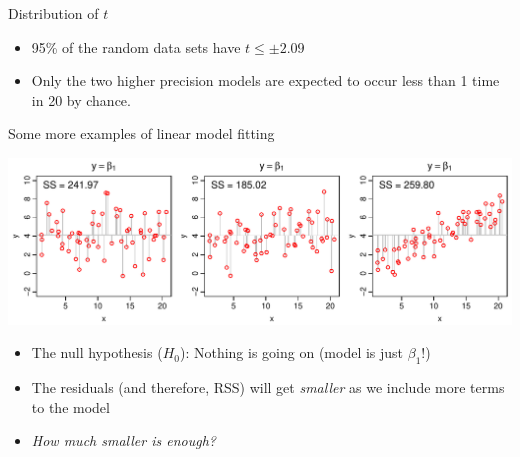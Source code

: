 \documentclass[xcolor=x11names,handout,compress]{beamer}
\renewcommand{\(}{\begin{columns}}
\renewcommand{\)}{\end{columns}}
\newcommand{\<}[1]{\begin{column}{#1}}
\renewcommand{\>}{\end{column}}
\begin{document}

\begin{frame}{Distribution of $t$}


\centerline{}

\pause 
\begin{itemize}[<+->] \itemsep6pt
    \item 95\% of the random data sets have $t\le \pm 2.09$
    \item Only the two higher precision models are expected to occur less than 1 time in 20 by chance.
\end{itemize}

\end{frame}


\begin{frame}{Some more examples of linear model fitting}

\includegraphics[width=\textwidth]{ANOVA_null.pdf}

\begin{itemize}[<+->]\itemsep6pt
\item The null hypothesis ($H_0$): Nothing is going on (model is just $\beta_1$!)
\item The residuals (and therefore, RSS) will get {\it smaller} as we include more terms to the model
\item {\it How much smaller is enough?}
\end{itemize}

\end{frame}

\end{document}
